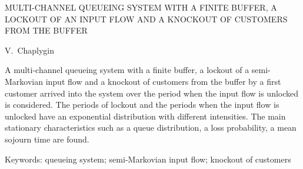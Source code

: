 MULTI-CHANNEL QUEUEING SYSTEM WITH A FINITE BUFFER, A LOCKOUT OF AN INPUT FLOW AND A KNOCKOUT
OF CUSTOMERS FROM THE BUFFER

V.~Chaplygin

A multi-channel queueing system with a finite buffer, a lockout of a semi-Markovian input
flow and a knockout of customers from the buffer by a first customer arrived into the system over the
period when the input flow is unlocked is considered. The periods of lockout and the periods when
the input flow is unlocked have an exponential distribution with different intensities. The main
stationary characteristics such as a queue distribution, a loss probability, a mean sojourn time are
found.

Keywords: queueing system; semi-Markovian input flow;
knockout of customers
